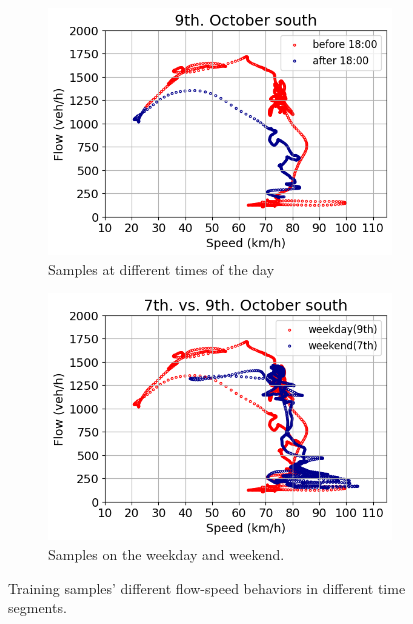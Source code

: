 \documentclass[english]{kththesis}
\begin{document}
\begin{figure}[!ht]
    \centering
    \begin{subfigure}{0.49\textwidth}
        \centering
        \includegraphics[width=\textwidth]{temporal_factors_a.png}
        \caption{Samples at different times of the day}
        \label{fig:temporalFactor_a}
    \end{subfigure}
    \hfill
    \begin{subfigure}{0.49\textwidth}
        \centering
        \includegraphics[width=\textwidth]{temporal_factors_b.png}
        \caption{Samples on the weekday and weekend.}
        \label{fig:temporalFactor_b}
    \end{subfigure}
    \caption{Training samples' different flow-speed behaviors in different time segments.}
    \label{fig:temporalFactors}
\end{figure}
\end{document}
